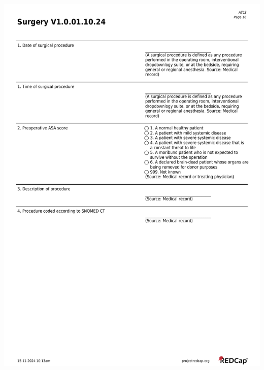 \documentclass[
]{scrartcl}
\begin{document}
\includegraphics{../case-record-form/instrument-pdfs/pages/all-instruments-16.pdf}
\end{document}
